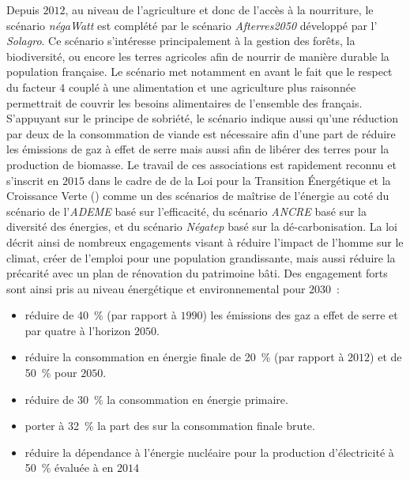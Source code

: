 Depuis $2012$, au niveau de l’agriculture et donc de l’accès à la nourriture, le scénario \textit{négaWatt}
est complété par le scénario \textit{Afterres2050} développé par l’ \textit{Solagro}. Ce
scénario s’intéresse principalement à la gestion des forêts, la biodiversité, ou encore
les terres agricoles afin de nourrir de manière durable la population française.
Le scénario met notamment en avant le fait que le respect du facteur $4$ couplé à une alimentation
et une agriculture plus raisonnée permettrait de couvrir les besoins alimentaires
de l’ensemble des français. S’appuyant sur le principe de sobriété, le scénario
indique aussi qu’une réduction par deux de la consommation de viande est
nécessaire afin d’une part de réduire les émissions de gaz à effet de serre mais
aussi afin de libérer des terres pour la production de biomasse.
Le travail de ces associations est rapidement reconnu et s’inscrit en $2015$ dans le cadre de
de la Loi pour la Transition Énergétique et la Croissance Verte
()
comme un des scénarios de maîtrise de l’énergie au coté du scénario de l’\textit{ADEME}
basé sur l’efficacité, du scénario \textit{ANCRE} basé sur la diversité des énergies, et du scénario \textit{Négatep}
basé sur la dé-carbonisation.
La loi décrit ainsi de nombreux engagements visant à réduire l’impact de l’homme sur le
climat, créer de l’emploi pour une population grandissante, mais aussi réduire la précarité
avec un plan de rénovation du patrimoine bâti. Des engagement forts sont ainsi pris au
niveau énergétique et environnemental pour $2030$~:
\begin{itemize}
    \item réduire de \SI{40}{\percent} (par rapport à $1990$) les émissions des gaz a
          effet de serre et par quatre à l’horizon $2050$.
    \item réduire la consommation en énergie finale de \SI{20}{\percent} (par rapport à $2012$)
          et de \SI{50}{\percent} pour $2050$.
    \item réduire de \SI{30}{\percent} la consommation en énergie primaire.
    \item porter à \SI{32}{\percent} la part des  sur la consommation finale brute.
    \item réduire la dépendance à l’énergie nucléaire pour la production d’électricité à
          \SI{50}{\percent} évaluée à  en $2014$
\end{itemize}

